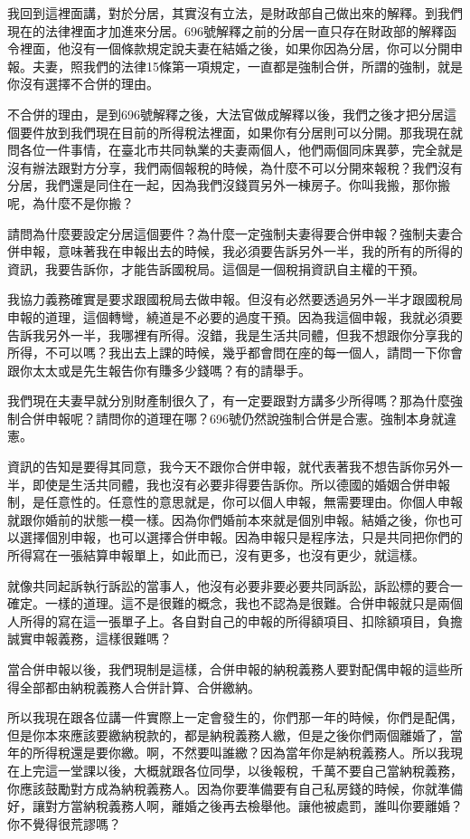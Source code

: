 \documentclass[oneside,sub3section]{ctexbook}
\begin{document}
我回到這裡面講，對於分居，其實沒有立法，是財政部自己做出來的解釋。到我們現在的法律裡面才加進來分居。696號解釋之前的分居一直只存在財政部的解釋函令裡面，他沒有一個條款規定說夫妻在結婚之後，如果你因為分居，你可以分開申報。夫妻，照我們的法律15條第一項規定，一直都是強制合併，所謂的強制，就是你沒有選擇不合併的理由。

不合併的理由，是到696號解釋之後，大法官做成解釋以後，我們之後才把分居這個要件放到我們現在目前的所得稅法裡面，如果你有分居則可以分開。那我現在就問各位一件事情，在臺北市共同執業的夫妻兩個人，他們兩個同床異夢，完全就是沒有辦法跟對方分享，我們兩個報稅的時候，為什麼不可以分開來報稅？我們沒有分居，我們還是同住在一起，因為我們沒錢買另外一棟房子。你叫我搬，那你搬呢，為什麼不是你搬？

請問為什麼要設定分居這個要件？為什麼一定強制夫妻得要合併申報？強制夫妻合併申報，意味著我在申報出去的時候，我必須要告訴另外一半，我的所有的所得的資訊，我要告訴你，才能告訴國稅局。這個是一個稅捐資訊自主權的干預。

我協力義務確實是要求跟國稅局去做申報。但沒有必然要透過另外一半才跟國稅局申報的道理，這個轉彎，繞道是不必要的過度干預。因為我這個申報，我就必須要告訴我另外一半，我哪裡有所得。沒錯，我是生活共同體，但我不想跟你分享我的所得，不可以嗎？我出去上課的時候，幾乎都會問在座的每一個人，請問一下你會跟你太太或是先生報告你有賺多少錢嗎？有的請舉手。

我們現在夫妻早就分別財產制很久了，有一定要跟對方講多少所得嗎？那為什麼強制合併申報呢？請問你的道理在哪？696號仍然說強制合併是合憲。強制本身就違憲。

資訊的告知是要得其同意，我今天不跟你合併申報，就代表著我不想告訴你另外一半，即使是生活共同體，我也沒有必要非得要告訴你。所以德國的婚姻合併申報制，是任意性的。任意性的意思就是，你可以個人申報，無需要理由。你個人申報就跟你婚前的狀態一模一樣。因為你們婚前本來就是個別申報。結婚之後，你也可以選擇個別申報，也可以選擇合併申報。因為申報只是程序法，只是共同把你們的所得寫在一張結算申報單上，如此而已，沒有更多，也沒有更少，就這樣。

就像共同起訴執行訴訟的當事人，他沒有必要非要必要共同訴訟，訴訟標的要合一確定。一樣的道理。這不是很難的概念，我也不認為是很難。合併申報就只是兩個人所得的寫在這一張單子上。各自對自己的申報的所得額項目、扣除額項目，負擔誠實申報義務，這樣很難嗎？

當合併申報以後，我們現制是這樣，合併申報的納稅義務人要對配偶申報的這些所得全部都由納稅義務人合併計算、合併繳納。

所以我現在跟各位講一件實際上一定會發生的，你們那一年的時候，你們是配偶，但是你本來應該要繳納稅款的，都是納稅義務人繳，但是之後你們兩個離婚了，當年的所得稅還是要你繳。啊，不然要叫誰繳？因為當年你是納稅義務人。所以我現在上完這一堂課以後，大概就跟各位同學，以後報稅，千萬不要自己當納稅義務，你應該鼓勵對方成為納稅義務人。因為你要準備要有自己私房錢的時候，你就準備好，讓對方當納稅義務人啊，離婚之後再去檢舉他。讓他被處罰，誰叫你要離婚？你不覺得很荒謬嗎？
\end{document}
